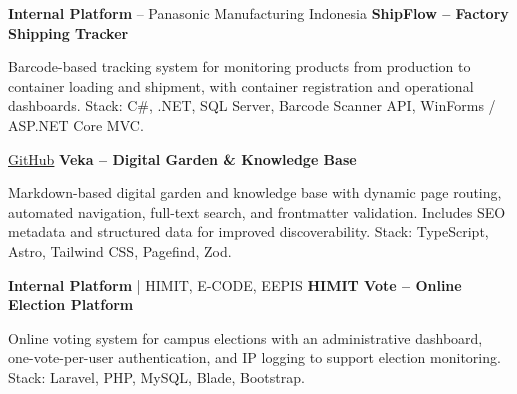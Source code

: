 \vspace{0.3 cm}


\samepage
\begin{twocolentrylink}{
		\textbf{Internal Platform} -- Panasonic Manufacturing Indonesia
	}
	\textbf{ShipFlow -- Factory Shipping Tracker}
\end{twocolentrylink}
\begin{onecolentry}
	Barcode-based tracking system for monitoring products from production to container loading and shipment, with container registration and operational dashboards. Stack: C\#, .NET, SQL Server, Barcode Scanner API, WinForms / ASP.NET Core MVC.
\end{onecolentry}

\vspace{0.3 cm}


\samepage
\begin{twocolentrylink}{
		\href{https://github.com/masmuss/veka}{GitHub}
	}
	\textbf{Veka -- Digital Garden \& Knowledge Base}
\end{twocolentrylink}
\begin{onecolentry}
	Markdown-based digital garden and knowledge base with dynamic page routing, automated navigation, full-text search, and frontmatter validation. Includes SEO metadata and structured data for improved discoverability. Stack: TypeScript, Astro, Tailwind CSS, Pagefind, Zod.
\end{onecolentry}

\vspace{0.3 cm}


\samepage
\begin{twocolentrylink}{
		\textbf{Internal Platform} | HIMIT, E-CODE, EEPIS
	}
	\textbf{HIMIT Vote -- Online Election Platform}
\end{twocolentrylink}
\begin{onecolentry}
	Online voting system for campus elections with an administrative dashboard, one-vote-per-user authentication, and IP logging to support election monitoring. Stack: Laravel, PHP, MySQL, Blade, Bootstrap.
\end{onecolentry}
